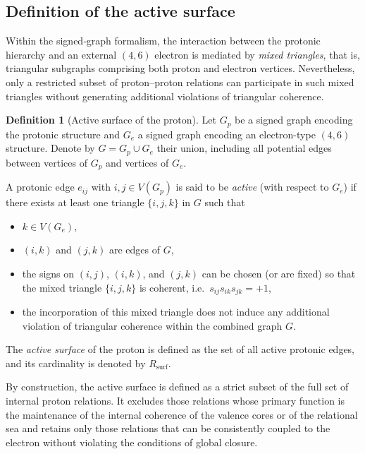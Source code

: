 \documentclass[11pt,a4paper]{article}
\theoremstyle{plain}
\theoremstyle{definition}
\newtheorem{definition}{Definition}
\theoremstyle{remark}
\begin{document}
\subsection{Definition of the active surface}

Within the signed‑graph formalism, the interaction between the protonic hierarchy and an external \((4,6)\) electron is mediated by \emph{mixed triangles}, that is, triangular subgraphs comprising both proton and electron vertices. Nevertheless, only a restricted subset of proton–proton relations can participate in such mixed triangles without generating additional violations of triangular coherence.

\begin{definition}[Active surface of the proton]
  Let \(G_p\) be a signed graph encoding the protonic structure and \(G_e\) a signed graph encoding an electron-type \((4,6)\) structure. Denote by \(G = G_p \cup G_e\) their union, including all potential edges between vertices of \(G_p\) and vertices of \(G_e\).

  A protonic edge \(e_{ij}\) with \(i,j \in V(G_p)\) is said to be \emph{active} (with respect to \(G_e\)) if there exists at least one triangle \(\{i,j,k\}\) in \(G\) such that
  \begin{itemize}
    \item \(k \in V(G_e)\),
    \item \((i,k)\) and \((j,k)\) are edges of \(G\),
    \item the signs on \((i,j)\), \((i,k)\), and \((j,k)\) can be chosen (or are fixed) so that the mixed triangle \(\{i,j,k\}\) is coherent, i.e.\ \(s_{ij} s_{ik} s_{jk} = +1\),
    \item the incorporation of this mixed triangle does not induce any additional violation of triangular coherence within the combined graph \(G\).
  \end{itemize}
  The \emph{active surface} of the proton is defined as the set of all active protonic edges, and its cardinality is denoted by \(R_{\mathrm{surf}}\).
\end{definition}

By construction, the active surface is defined as a strict subset of the full set of internal proton relations. It excludes those relations whose primary function is the maintenance of the internal coherence of the valence cores or of the relational sea and retains only those relations that can be consistently coupled to the electron without violating the conditions of global closure.
\end{document}

